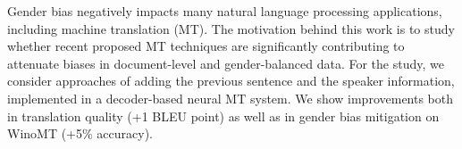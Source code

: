 Gender bias negatively impacts many natural language processing applications, including machine translation (MT).  The motivation behind this work is to study whether recent proposed MT techniques are significantly contributing to attenuate biases in document-level and gender-balanced data. For the study, we consider approaches of adding the previous sentence and the speaker information, implemented in a decoder-based neural MT system. We show improvements both in translation quality (+1 BLEU point) as well as in gender bias mitigation on WinoMT (+5\% accuracy).
